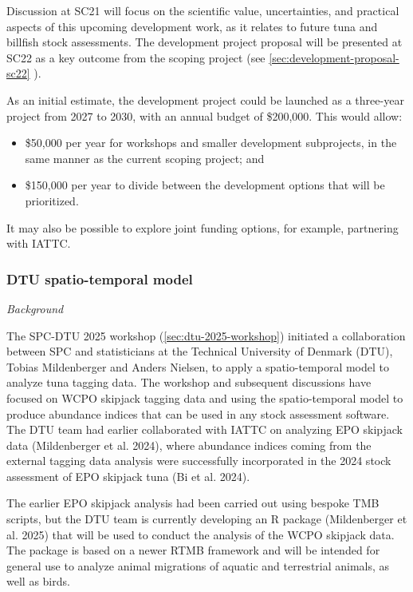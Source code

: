 \documentclass{SCreport}
\begin{document}
Discussion at SC21 will focus on the scientific value, uncertainties, and
practical aspects of this upcoming development work, as it relates to future
tuna and billfish stock assessments. The development project proposal will be
presented at SC22 as a key outcome from the scoping project
(see \autoref{sec:development-proposal-sc22} ).

As an initial estimate, the development project could be launched as a
three-year project from 2027 to 2030, with an annual budget of \$200,000. This
would allow:

\begin{itemize}
  \item \$50,000 per year for workshops and smaller development subprojects, in
  the same manner as the current scoping project; and
  \item \$150,000 per year to divide between the development options that will
  be prioritized.
\end{itemize}

\vspace{2ex}

It may also be possible to explore joint funding options, for example,
partnering with IATTC.

\newpage

\subsubsection{DTU spatio-temporal model}
\label{sec:dtu-development-project}

\vspace{1ex}

\textit{Background}

The SPC-DTU 2025 workshop (\autoref{sec:dtu-2025-workshop}) initiated a
collaboration between SPC and statisticians at the Technical University of
Denmark (DTU), Tobias Mildenberger and Anders Nielsen, to apply a
spatio-temporal model to analyze tuna tagging data. The workshop and subsequent
discussions have focused on WCPO skipjack tagging data and using the
spatio-temporal model to produce abundance indices that can be used in any stock
assessment software. The DTU team had earlier collaborated with IATTC on
analyzing EPO skipjack data (Mildenberger et al. 2024), where abundance indices
coming from the external tagging data analysis were successfully incorporated in
the 2024 stock assessment of EPO skipjack tuna (Bi et al. 2024).

The earlier EPO skipjack analysis had been carried out using bespoke TMB
scripts, but the DTU team is currently developing an R package (Mildenberger et
al. 2025) that will be used to conduct the analysis of the WCPO skipjack data.
The package is based on a newer RTMB framework and will be intended for general
use to analyze animal migrations of aquatic and terrestrial animals, as well as
birds.
\end{document}
